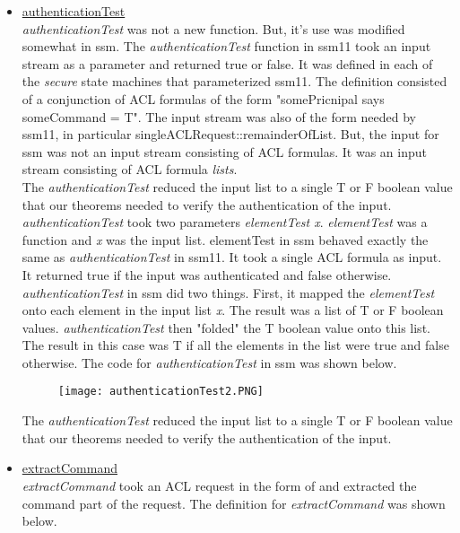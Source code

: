    \begin{itemize}
   
   \item \underline{authenticationTest}\\
     \textit{authenticationTest} was not a new function.  But, it's use was modified somewhat in ssm.
      The \textit{authenticationTest} function in ssm11 took an input stream as a parameter and returned
      true or false.  It was defined in each of the \textit{secure} state machines that parameterized ssm11.
      The definition consisted of a conjunction of ACL formulas of the form "somePricnipal says someCommand = T".
      The input stream was also of the form needed by ssm11, in particular singleACLRequest::remainderOfList.
      But, the input for ssm was not an input stream consisting of ACL formulas.  It was an input stream
      consisting of ACL formula \textit{lists}.\\
      
     The \textit{authenticationTest} reduced the input list to a single T or F boolean value that our
      theorems needed to verify the authentication of the input.  \textit{authenticationTest} took two
      parameters \textit{elementTest x}.  \textit{elementTest} was a function and \textit{x} was the input list.
      elementTest in ssm behaved exactly the same as \textit{authenticationTest} in ssm11.  It took a single
      ACL formula as input.  It returned true if the input was authenticated and false otherwise.
      \textit{authenticationTest} in ssm did two things.  First, it mapped the \textit{elementTest} onto each
      element in the input list \textit{x}. The result was a list of T or F boolean values.
      \textit{authenticationTest} then "folded" the T boolean value onto this list.  The result in this
      case was T if all the elements in the list were true and false otherwise.  The code for
      \textit{authenticationTest} in ssm was shown below.\\
      
\begin{figure}[h]
  \centering
  \texttt{[image: authenticationTest2.PNG]}
\end{figure}

 The \textit{authenticationTest} reduced the input list to a single T or F boolean value that our
  theorems needed to verify the authentication of the input.\\


 \item \underline{extractCommand}\\
  \textit{extractCommand} took an ACL request in the form of and extracted the command part of the request.
  The definition for \textit{extractCommand} was shown below.\\
  

\end{itemize}
